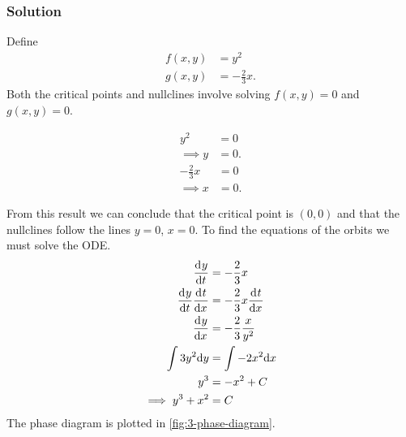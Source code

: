 \documentclass[12pt]{article}
\begin{document}
\subsubsection*{Solution}
Define
\begin{equation}
  \begin{aligned}
    f(x,y) &= y^2 \\
    g(x,y) &= -\frac{2}{3}x.
  \end{aligned}
\end{equation}
Both the critical points and nullclines involve solving $f(x,y)=0$ and
$g(x,y)=0$.
\begin{multicols}{2}
  \begin{equation*}
    \begin{aligned}
      y^2 &= 0 \\
      \implies y &= 0.
    \end{aligned}
  \end{equation*}
  \begin{equation*}
    \begin{aligned}
      -\frac{2}{3}x &= 0 \\
      \implies x &= 0.
    \end{aligned}
  \end{equation*}
\end{multicols} \noindent
From this result we can conclude that the critical point is $(0,0)$ and that the
nullclines follow the lines $y=0$, $x=0$. To find the equations of the orbits we
must solve the ODE.
\begin{equation}
  \begin{aligned}
    \frac{\mathrm{d}^{} {y}}{\mathrm{d}{t}^{}} &= -\frac{2}{3}x \\
    \frac{\mathrm{d}^{} {y}}{\mathrm{d}{t}^{}} \frac{\mathrm{d}^{} {t}}{\mathrm{d}{x}^{}} &= -\frac{2}{3}x \frac{\mathrm{d}^{} {t}}{\mathrm{d}{x}^{}} \\
    \frac{\mathrm{d}^{} {y}}{\mathrm{d}{x}^{}} &= -\frac{2}{3}\frac{x}{y^2} \\
    \int 3y^2 \mathrm{d}{y} &= \int -2x^2 \mathrm{d}{x} \\
    y^3 &= -x^2 + C \\
    \implies y^3 + x^2 &= C
  \end{aligned}
\end{equation}
The phase diagram is plotted in \cref{fig:3-phase-diagram}.

\end{document}
